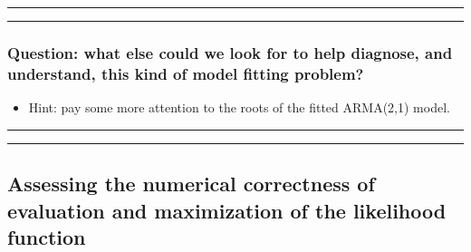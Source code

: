 \documentclass[]{article}
\providecommand{\tightlist}{%
  \setlength{\itemsep}{0pt}\setlength{\parskip}{0pt}}
\begin{document}
\begin{center}\rule{0.5\linewidth}{\linethickness}\end{center}

\begin{center}\rule{0.5\linewidth}{\linethickness}\end{center}

\subsubsection{Question: what else could we look for to help diagnose,
and understand, this kind of model fitting
problem?}\label{question-what-else-could-we-look-for-to-help-diagnose-and-understand-this-kind-of-model-fitting-problem}

\begin{itemize}
\tightlist
\item
  Hint: pay some more attention to the roots of the fitted ARMA(2,1)
  model.
\end{itemize}

\begin{center}\rule{0.5\linewidth}{\linethickness}\end{center}

\begin{center}\rule{0.5\linewidth}{\linethickness}\end{center}

\subsection{Assessing the numerical correctness of evaluation and
maximization of the likelihood
function}\label{assessing-the-numerical-correctness-of-evaluation-and-maximization-of-the-likelihood-function}
\end{document}
